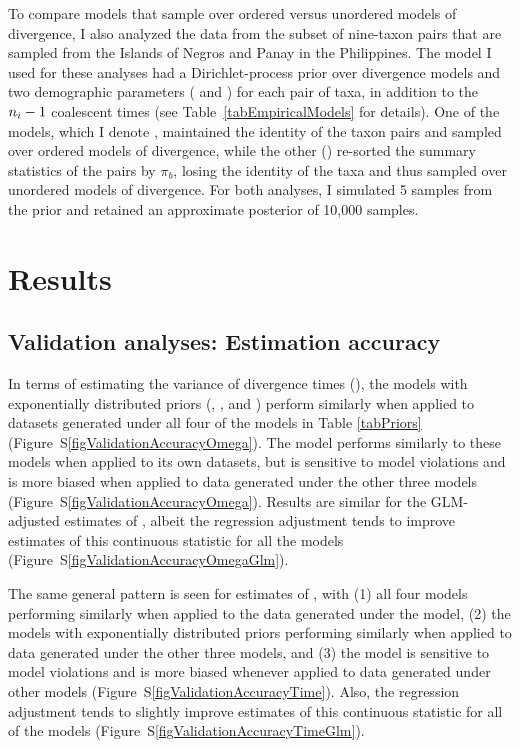 To compare models that sample over ordered versus unordered models of
divergence, I also analyzed the data from the subset of nine-taxon pairs that
are sampled from the Islands of Negros and Panay in the Philippines.
The model I used for these analyses had a Dirichlet-process prior over
divergence models and two demographic parameters (\ancestralTheta{} and
\descendantTheta{}{}) for each pair of taxa, in addition to the
$\popSampleSize{i}{} - 1$ coalescent times (see Table~\ref{tabEmpiricalModels}
for details).
One of the models, which I denote \npModelDPPOrdered, maintained the identity
of the taxon pairs and sampled over ordered models of divergence, while the
other (\npModelDPP) re-sorted the summary statistics of the pairs by $\pi_b$,
losing the identity of the taxa and thus sampled over unordered models of
divergence.
For both analyses, I simulated 5 samples from the prior and retained an
approximate posterior of 10,000 samples.

\section{Results}
\subsection{Validation analyses: Estimation accuracy}
In terms of estimating the variance of divergence times (\divTimeDispersion),
the models with exponentially distributed priors (\modelUshaped, \modelUniform,
and \modelDPP) perform similarly when applied to datasets generated under all
four of the models in Table \ref{tabPriors}
(Figure~S\ref{figValidationAccuracyOmega}).
The \modelOld model performs similarly to these models when applied to its
own datasets, but is sensitive to model violations and is more biased when
applied to data generated under the other three models
(Figure~S\ref{figValidationAccuracyOmega}).
Results are similar for the GLM-adjusted estimates of \divTimeDispersion,
albeit the regression adjustment tends to improve estimates of this continuous
statistic for all the models
(Figure~S\ref{figValidationAccuracyOmegaGlm}).

The same general pattern is seen for estimates of \divTimeMean, with
(1) all four models performing similarly when applied to the data generated
under the \modelOld model,
(2) the models with exponentially distributed priors performing similarly when
applied to data generated under the other three models, and
(3) the \modelOld model is sensitive to model violations and is more biased
whenever applied to data generated under other models
(Figure~S\ref{figValidationAccuracyTime}).
Also, the regression adjustment tends to slightly improve estimates of
this continuous statistic for all of the models
(Figure~S\ref{figValidationAccuracyTimeGlm}).

